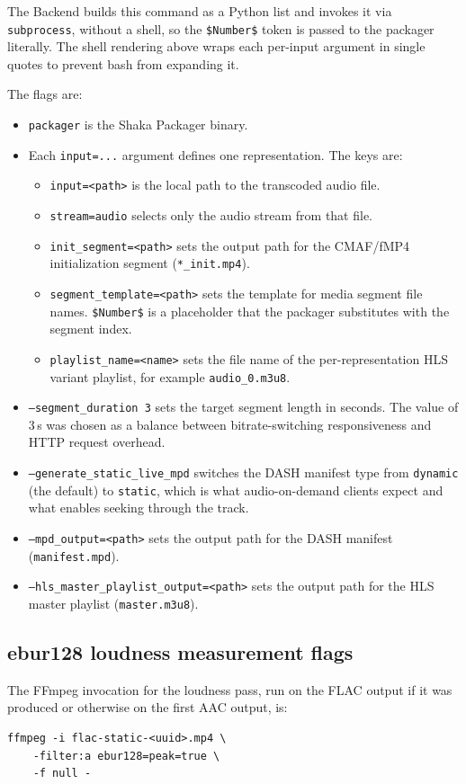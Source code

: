 \documentclass[a4paper,11pt]{article}
\begin{document}
The Backend builds this command as a Python list and invokes it via
\texttt{subprocess}, without a shell, so the \texttt{\$Number\$} token
is passed to the packager literally. The shell rendering above wraps
each per-input argument in single quotes to prevent bash from
expanding it.

The flags are:
\begin{itemize}
    \item \texttt{packager} is the Shaka Packager binary.
    \item Each \texttt{input=...} argument defines one representation.
    The keys are:
    \begin{itemize}
        \item \texttt{input=<path>} is the local path to the
        transcoded audio file.
        \item \texttt{stream=audio} selects only the audio stream from
        that file.
        \item \texttt{init\_segment=<path>} sets the output path for
        the CMAF/fMP4 initialization segment (\texttt{*\_init.mp4}).
        \item \texttt{segment\_template=<path>} sets the template for
        media segment file names. \texttt{\$Number\$} is a placeholder
        that the packager substitutes with the segment index.
        \item \texttt{playlist\_name=<name>} sets the file name of the
        per-representation HLS variant playlist, for example
        \texttt{audio\_0.m3u8}.
    \end{itemize}
    \item \texttt{--segment\_duration 3} sets the target segment
    length in seconds. The value of 3\,s was chosen as a balance
    between bitrate-switching responsiveness and HTTP request
    overhead.
    \item \texttt{--generate\_static\_live\_mpd} switches the DASH
    manifest type from \texttt{dynamic} (the default) to
    \texttt{static}, which is what audio-on-demand clients expect and
    what enables seeking through the track.
    \item \texttt{--mpd\_output=<path>} sets the output path for the
    DASH manifest (\texttt{manifest.mpd}).
    \item \texttt{--hls\_master\_playlist\_output=<path>} sets the
    output path for the HLS master playlist (\texttt{master.m3u8}).
\end{itemize}

\subsection{ebur128 loudness measurement flags}
The FFmpeg invocation for the loudness pass, run on the FLAC output if
it was produced or otherwise on the first AAC output, is:
\begin{verbatim}
ffmpeg -i flac-static-<uuid>.mp4 \
    -filter:a ebur128=peak=true \
    -f null -
\end{verbatim}
\end{document}

